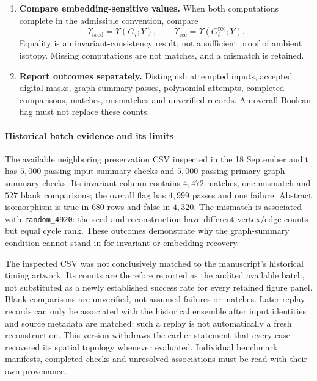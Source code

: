 \documentclass[10pt,twocolumn]{article}
\begin{document}
\begin{center}
{\begin{minipage}{0.92\linewidth}
\begin{enumerate}[leftmargin=*,label=\textbf{\arabic*.},itemsep=3pt,topsep=4pt]
\item \textbf{Compare embedding-sensitive values.} When both computations complete in the admissible convention, compare
\begin{equation*}
\overline{\Upsilon}_{\mathrm{seed}}=\overline{\Upsilon}(G_i;Y),\qquad
\overline{\Upsilon}_{\mathrm{rec}}=\overline{\Upsilon}(G_i^{\mathrm{rec}};Y).
\end{equation*}
Equality is an invariant-consistency result, not a sufficient proof of ambient isotopy. Missing computations are not matches, and a mismatch is retained.
\item \textbf{Report outcomes separately.} Distinguish attempted inputs, accepted digital masks, graph-summary passes, polynomial attempts, completed comparisons, matches, mismatches and unverified records. An overall Boolean flag must not replace these counts.
\end{enumerate}
\end{minipage}}
\end{center}

\paragraph{Historical batch evidence and its limits}
The available neighboring preservation CSV inspected in the 18 September audit has $5{,}000$ passing input-summary checks and $5{,}000$ passing primary graph-summary checks. Its invariant column contains $4{,}472$ matches, one mismatch and $527$ blank comparisons; the overall flag has $4{,}999$ passes and one failure. Abstract isomorphism is true in $680$ rows and false in $4{,}320$. The mismatch is associated with \texttt{random\_4920}: the seed and reconstruction have different vertex/edge counts but equal cycle rank. These outcomes demonstrate why the graph-summary condition cannot stand in for invariant or embedding recovery.

The inspected CSV was not conclusively matched to the manuscript's historical timing artwork. Its counts are therefore reported as the audited available batch, not substituted as a newly established success rate for every retained figure panel. Blank comparisons are unverified, not assumed failures or matches. Later replay records can only be associated with the historical ensemble after input identities and source metadata are matched; such a replay is not automatically a fresh reconstruction. This version withdraws the earlier statement that every case recovered its spatial topology whenever evaluated. Individual benchmark manifests, completed checks and unresolved associations must be read with their own provenance.
\end{document}
